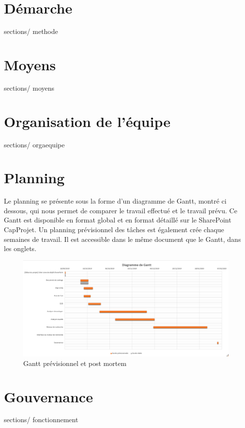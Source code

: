 \documentclass[french, 11pt, a4paper]{article}
\begin{document}
\section {Démarche}
 {sections/} {methode}

\section {Moyens}
 {sections/} {moyens}

\section {Organisation de l'équipe}
 {sections/} {orgaequipe}

\newpage
\section {Planning}
Le planning se présente sous la forme d'un diagramme de Gantt, montré ci dessous, qui nous permet de comparer le travail effectué et le travail prévu.
Ce Gantt est disponible en format global et en format détaillé sur le SharePoint CapProjet.
Un planning prévisionnel des tâches est également crée chaque semaines de travail.
Il est accessible dans le même document que le Gantt, dans les onglets.

\begin{figure}[h!]
	\includegraphics[width=\linewidth]{images/gantt.png}
	\caption{Gantt prévisionnel et post mortem}
	\label{fig:MC}
\end{figure}		

\section {Gouvernance}
 {sections/} {fonctionnement}

\newpage
\end{document}
